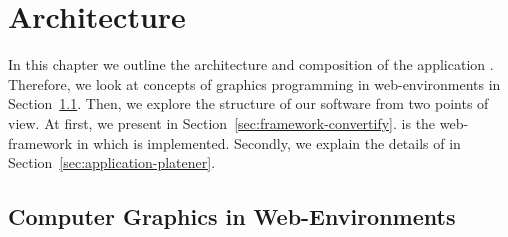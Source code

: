 \documentclass[../ClassicThesis.tex]{subfiles}
\begin{document}
\newcommand\myNotes[1]{\textcolor{red}{#1}}
\newcommand{\note}[1]{\myNotes{#1}}
\newcommand{\class}[1]{\emph{#1}}
\newcommand{\name}[1]{\textit{#1}}


\chapter{Architecture}
\label{ch:architecture}

In this chapter we outline the architecture and composition of the
application {\platener}. Therefore, we look at concepts of graphics
programming in web-environments in Section~\ref{sec:cg-web}. Then, we
explore the structure of our software from two points of view. At
first, we present {\convertify} in
Section~\ref{sec:framework-convertify}. {\convertify} is the
web-framework in which {\platener} is implemented. Secondly, we
explain the details of {\platener} in
Section~\ref{sec:application-platener}.




\section{Computer Graphics in Web-Environments}
\label{sec:cg-web}
\end{document}
